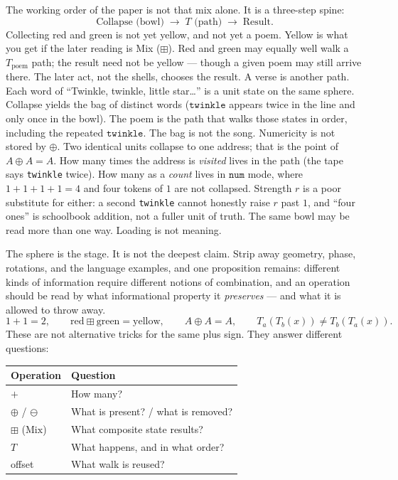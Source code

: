 \documentclass[12pt, a4paper]{article}
\begin{document}
The working order of the paper is not that mix alone. It is a three-step spine:
\[
\text{Collapse (bowl)} \;\longrightarrow\; T\text{ (path)} \;\longrightarrow\; \text{Result}.
\]
Collecting red and green is not yet yellow, and not yet a poem.
Yellow is what you get if the later reading is Mix ($\boxplus$).
Red and green may equally well walk a $T_{\mathrm{poem}}$ path; the
result need not be yellow --- though a given poem may still arrive
there. The later act, not the shells, chooses the result. A verse is
another path.
Each word of ``Twinkle, twinkle, little star\ldots'' is a unit state
on the same sphere. Collapse yields the bag of distinct words
($\texttt{twinkle}$ appears twice in the line and only once in the
bowl). The poem is the path that walks those states in order,
including the repeated $\texttt{twinkle}$. The bag is not the song.
Numericity is not stored by $\oplus$. Two identical units collapse
to one address; that is the point of $A\oplus A=A$. How many times
the address is \emph{visited} lives in the path (the tape says
\texttt{twinkle} twice). How many as a \emph{count} lives in
$\mathtt{num}$ mode, where $1+1+1+1=4$ and four tokens of $1$ are
not collapsed. Strength $r$ is a poor substitute for either: a
second \texttt{twinkle} cannot honestly raise $r$ past $1$, and
``four ones'' is schoolbook addition, not a fuller unit of truth.
The same bowl may be read more than one way. Loading is not meaning.

The sphere is the stage. It is not the deepest claim. Strip away
geometry, phase, rotations, and the language examples, and one
proposition remains: different kinds of information require different
notions of combination, and an operation should be read by what
informational property it \emph{preserves} --- and what it is allowed
to throw away.
\[
1+1=2,
\qquad
\mathrm{red}\boxplus\mathrm{green}=\mathrm{yellow},
\qquad
A\oplus A=A,
\qquad
T_a(T_b(x))\neq T_b(T_a(x)).
\]
These are not alternative tricks for the same plus sign. They answer
different questions:

\begin{center}
\begin{tabular}{ll}
Operation & Question \\
\hline
$+$ & How many? \\
$\oplus$ / $\ominus$ & What is present? / what is removed? \\
$\boxplus$ ($\mathrm{Mix}$) & What composite state results? \\
$T$ & What happens, and in what order? \\
offset & What walk is reused? \\
\end{tabular}
\end{center}
\end{document}
